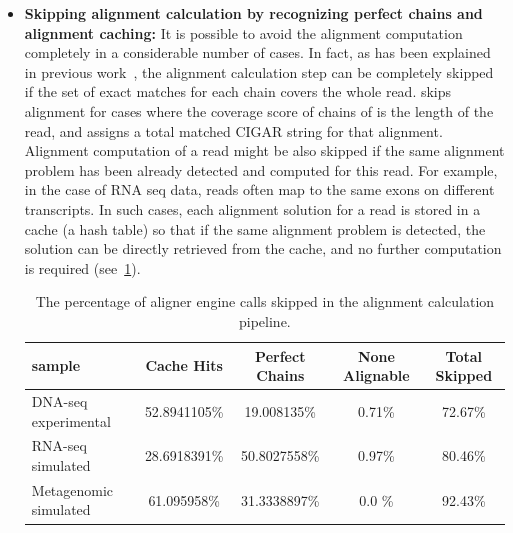 \begin{itemize}
    \item \textbf{Skipping alignment calculation by recognizing perfect chains and alignment caching:} It is possible to avoid the alignment computation completely in a considerable number of cases. In fact, as has been explained in previous work~\citep{selaln}, the alignment calculation step can be completely skipped if the set of exact matches for each chain covers the whole read. \puffaligner skips alignment for cases where the coverage score of chains of \mems is the length of the read, and assigns a total matched CIGAR string for that alignment. Alignment computation of a read might be also skipped if the same alignment problem has been already detected and computed for this read. For example, in the case of RNA seq data, reads often map to the same exons on different transcripts. In such cases, each alignment solution for a read is stored in a cache (a hash table) so that if the same alignment problem is detected, the solution can be directly retrieved from the cache, and no further computation is required (see~\cref{tab:skipped-alignments}).

    \begin{table}%
    \centering
    \begin{tabular}{lcccc}
        \toprule sample & Cache Hits & Perfect Chains & None Alignable & Total Skipped \\
        \midrule
        DNA-seq experimental & \num{52.8941105}\% & \num{19.008135}\% & \num{0.71}\% & \num{72.67}\% \\
        RNA-seq simulated & \num{28.6918391}\% & \num{50.8027558}\% & \num{0.97}\% & \num{80.46}\% \\
        Metagenomic simulated & \num{61.095958}\% & \num{31.3338897}\% & \num{0.0} \% & \num{92.43}\% \\
        \bottomrule
    \end{tabular}
    \caption[he percentage of skipped aligner engine calls]{The percentage of aligner engine calls skipped in the alignment calculation pipeline.}
    \label{tab:skipped-alignments}
    \end{table}


\end{itemize}
